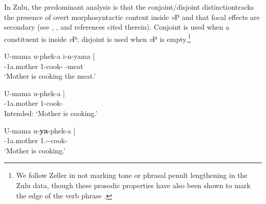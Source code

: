 \documentclass[output=paper]{langscibook}
\begin{document}
In Zulu, the predominant analysis is that the conjoint/disjoint distinction\linebreak tracks the presence of overt morphosyntactic content inside \textit{v}P and that focal effects are secondary (see \citealt{Halpert:2016:Book}, \citealt{Zeller:2015:ZuluDrD}, and references cited therein). Conjoint is used when a constituent is inside \textit{v}P; disjoint is used when \textit{v}P is empty.\footnote{We follow Zeller in not marking tone or phrasal penult lengthening in the Zulu data, though these prosodic properties have also been shown to mark the edge of the verb phrase \citep{VanDerSpuy:1993:NguniOm,ChengDowning:2009:ZuluTopic}.}

\ea 
\begin{xlist}

\ex 
\gll U-mama u-phek-a i-n-yama  {]}\\
\Aug-1a.mother 1\Sm-cook-\Fv{} -meat\\
\glt `Mother is cooking the meat.’

\ex 
\gll  *U-mama u-phek-a  {]}\\
\Aug-1a.mother 1\Sm-cook-\Fv{}\\
\glt Intended: `Mother is cooking.’

\ex 
\gll U-mama u-\textbf{ya}-phek-a  {]}\\
\Aug-1a.mother 1.\Sm-\Dj-cook-\Fv{}\\
\glt `Mother is cooking.’ \citep{Zeller:2015:ZuluDrD}

\end{xlist}
\z 





\end{document}
